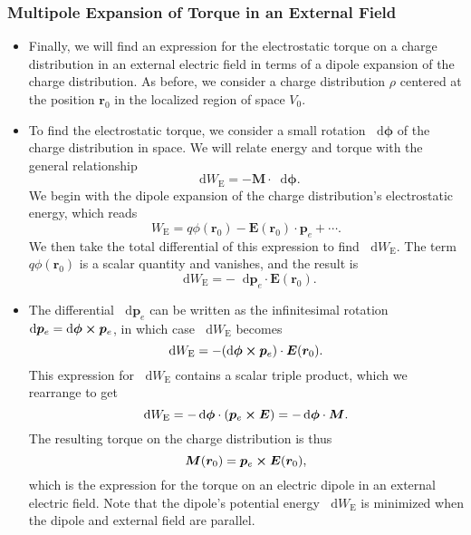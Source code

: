 \documentclass[11pt, a4paper]{article}
\newcommand{\diff}{\mathop{}\!\mathrm{d}} %
\renewcommand{\vec}[1]{\bm{#1}} %
\renewcommand{\r}{\vec{r}}
\newcommand{\E}{\vec{E}} %
\newcommand{\pe}{\vec{p}_{e}}  %
\begin{document}
\subsubsection{Multipole Expansion of Torque in an External Field}
\begin{itemize}
	\item  Finally, we will find an expression for the electrostatic torque on a charge distribution in an external electric field in terms of a dipole expansion of the charge distribution. As before, we consider a charge distribution $ \rho $ centered at the position $ \r_{0} $ in the localized region of space $ V_{0} $. 
	
	\item To find the electrostatic torque, we consider a small rotation $ \diff \vec{\phi} $ of the charge distribution in space. We will relate energy and torque with the general relationship
	\begin{equation*}
		\diff W_{\text{E}} = - \vec{M} \cdot \diff \vec{\phi}.
	\end{equation*}
	We begin with the dipole expansion of the charge distribution's electrostatic energy, which reads
	\begin{equation*}
		W_{\text{E}} = q \phi(\r_{0}) - \E (\r_{0}) \cdot \pe + \cdots.
	\end{equation*}
    We then take the total differential of this expression to find $ \diff W_{\text{E}} $. The term $ q \phi(\r_{0}) $ is a scalar quantity and vanishes, and the result is
	\begin{equation*}
		\diff W_{\text{E}} = - \diff \pe \cdot \E(\r_{0}).
	\end{equation*}
    
    \item The differential $ \diff \pe $ can be written as the infinitesimal rotation $ \diff \pe = \diff \vec{\phi} \cross \pe $, in which case $ \diff W_{\text{E}} $ becomes
	\begin{equation*}
		\diff W_{\text{E}} = - (\diff \vec{\phi} \cross \pe)\cdot \E(\r_{0}).
	\end{equation*}
	This expression for $ \diff W_{\text{E}} $ contains a scalar triple product, which we rearrange to get
	\begin{equation*}
		\diff W_{\text{E}} = - \diff \vec{\phi} \cdot (\pe \cross \E) = - \diff \vec{\phi} \cdot \vec{M}.
	\end{equation*}
    The resulting torque on the charge distribution is thus 
    \begin{equation*}
       \vec{M}(\r_{0}) = \pe \cross \E(\r_{0}),
    \end{equation*}
    which is the expression for the torque on an electric dipole in an external electric field. Note that the dipole's potential energy $ \diff W_{\text{E}} $ is minimized when the dipole and external field are parallel.
	
\end{itemize}
\end{document}
